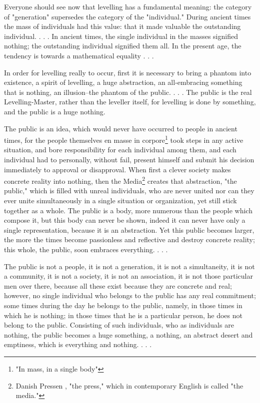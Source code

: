 \documentclass[12pt]{article}
\begin{document}
   Everyone should see now that levelling has a fundamental meaning: the
category of "generation" supersedes the category of the "individual." During
ancient times the mass of individuals had this value: that it made valuable
the outstanding individual. . . . In ancient times, the single individual in
the masses signified nothing; the outstanding individual signified them all.
In the present age, the tendency is towards a mathematical equality . . .

   In order for levelling really to occur, first it is necessary to
bring a phantom into existence, a spirit of levelling, a huge abstraction,
an all-embracing something that is nothing, an illusion--the phantom of the
public. . . . The public is the real Levelling-Master, rather than the
leveller itself, for levelling is done by something, and the public is a
huge nothing.

   The public is an idea, which would never have occurred to people in
ancient times, for the people themselves en masse in corpore\footnote{"In mass, in a single body"} took steps
in any active situation, and bore responsibility for each individual among
them, and each individual had to personally, without fail, present himself
and submit his decision immediately to approval or disapproval. When first a
clever society makes concrete reality into nothing, then the 
Media\footnote{Danish Pressen , "the press," which in contemporary English is called "the
media."} creates
that abstraction, "the public," which is filled with unreal individuals, who
are never united nor can they ever unite simultaneously in a single
situation or organization, yet still stick together as a whole. The public
is a body, more numerous than the people which compose it, but this body can
never be shown, indeed it can never have only a single representation,
because it is an abstraction. Yet this public becomes larger, the more the
times become passionless and reflective and destroy concrete reality; this
whole, the public, soon embraces everything. . . .

   The public is not a people, it is not a generation, it is not a
simultaneity, it is not a community, it is not a society, it is not an
association, it is not those particular men over there, because all these
exist because they are concrete and real; however, no single individual who
belongs to the public has any real commitment; some times during the day he
belongs to the public, namely, in those times in which he is nothing; in
those times that he is a particular person, he does not belong to the
public. Consisting of such individuals, who as individuals are nothing, the
public becomes a huge something, a nothing, an abstract desert and
emptiness, which is everything and nothing. . . .
\end{document}
